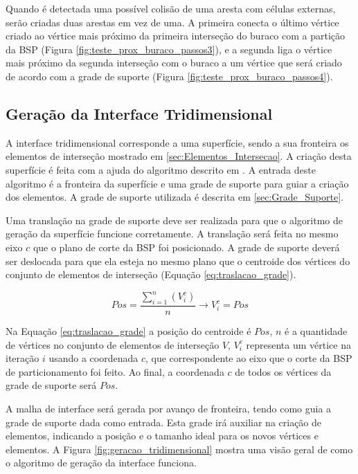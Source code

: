 Quando é detectada uma possível colisão de uma aresta com células externas, serão criadas duas arestas em vez de uma. A primeira conecta o último vértice criado ao vértice mais próximo da primeira interseção do buraco com a partição da BSP (Figura \ref{fig:teste_prox_buraco_passos3}), e a segunda liga o vértice mais próximo da segunda interseção com o buraco a um vértice que será criado de acordo com a grade de suporte (Figura \ref{fig:teste_prox_buraco_passos4}).

\subsection{Geração da Interface Tridimensional}

A interface tridimensional corresponde a uma superfície, sendo a sua fronteira os elementos de interseção mostrado em \ref{sec:Elementos_Intersecao}. A criação desta superfície é feita com a ajuda do algoritmo descrito em \cite{bib:miranda2009surface}. A entrada deste algoritmo é a fronteira da superfície e uma grade de suporte para guiar a criação dos elementos. A grade de suporte utilizada é descrita em \ref{sec:Grade_Suporte}.

Uma translação na grade de suporte deve ser realizada para que o algoritmo de geração da superfície funcione corretamente. A translação será feita no mesmo eixo $c$ que o plano de corte da BSP foi posicionado. A grade de suporte deverá ser deslocada para que ela esteja no mesmo plano que o centroide dos vértices do conjunto de elementos de interseção (Equação \ref{eq:traslacao_grade}). 

\begin{equation}
Pos = \frac{\sum_{i=1}^{n} (V_i^c)}{n} \longrightarrow V_i^c = Pos
\label{eq:traslacao_grade}
\end{equation}

Na Equação \ref{eq:traslacao_grade} a posição do centroide é $Pos$, $n$ é a quantidade de vértices no conjunto de elementos de interseção $V$, $V_i^c$ representa um vértice na iteração $i$ usando a coordenada $c$, que correspondente ao eixo que o corte da BSP de particionamento foi feito. Ao final, a coordenada $c$ de todos os vértices da grade de suporte será $Pos$.

A malha de interface será gerada por avanço de fronteira, tendo como guia a grade de suporte dada como entrada. Esta grade irá auxiliar na criação de elementos, indicando a posição e o tamanho ideal para os novos vértices e elementos. A Figura \ref{fig:geracao_tridimensional} mostra uma visão geral de como o algoritmo de geração da interface funciona.

